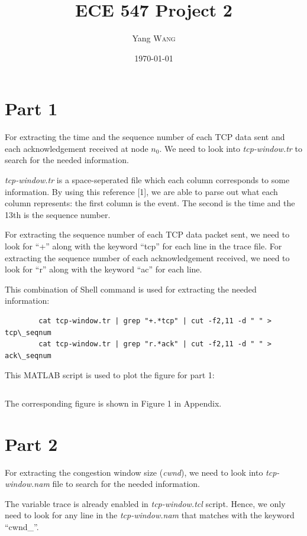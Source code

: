 \documentclass{article}
\title{ECE 547 Project 2} %
\author{Yang \textsc{Wang}}  %
\date{\today} %
\begin{document}
\maketitle %


\section*{Part 1}
	For extracting the time and the sequence number of each TCP data sent and each
	acknowledgement received at node $n_{0}$. We need to look into
	\emph{tcp-window.tr} to search for the needed information.

	\emph{tcp-window.tr} is a space-seperated file which each column corresponds
	to some information. By using this reference [1], we are able to parse out
	what each column represents: the first column is the event. The second is the
	time and the 13th is the sequence number.

	For extracting the sequence number of each TCP data packet sent, we need to
	look for ``+'' along with the keyword ``tcp'' for each line in the trace file.
	For extracting the sequence number of each acknowledgement received, we need
	to look for ``r'' along with the keyword ``ac'' for each line.
	
	This combination of Shell command is used for extracting the needed
	information:
	\begin{verbatim}
		cat tcp-window.tr | grep "+.*tcp" | cut -f2,11 -d " " > tcp\_seqnum
		cat tcp-window.tr | grep "r.*ack" | cut -f2,11 -d " " > ack\_seqnum
	\end{verbatim}
	
	This MATLAB script is used to plot the figure for part 1:
	\inputminted[tabsize=2,breaklines]{matlab}{proj1\_p1.m}

	The corresponding figure is shown in Figure 1 in Appendix.

\section*{Part 2}
	For extracting the congestion window size (\emph{cwnd}), we need to look into
	\emph{tcp-window.nam} file to search for the needed information.

	The variable trace is already enabled in \emph{tcp-window.tcl} script. Hence,
	we only need to look for any line in the \emph{tcp-window.nam} that matches
	with the keyword ``cwnd\_''.
\end{document}
